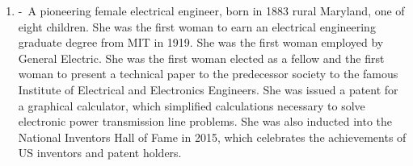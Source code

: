 \documentclass[12pt,a4paper]{article}
\begin{document}
\begin{enumerate}
    \item {} -\ A pioneering female electrical engineer, born in 1883 rural Maryland, one of eight children. She was the first woman to earn an electrical engineering graduate degree from MIT in 1919. She was the first woman employed by General Electric. She was the first woman elected as a fellow and the first woman to present a technical paper to the predecessor society to the famous Institute of Electrical and Electronics Engineers. She was issued a patent for a graphical calculator, which simplified calculations necessary to solve electronic power transmission line problems. She was also inducted into the National Inventors Hall of Fame in 2015, which celebrates the achievements of US inventors and patent holders.
  \end{enumerate}
\end{document}
